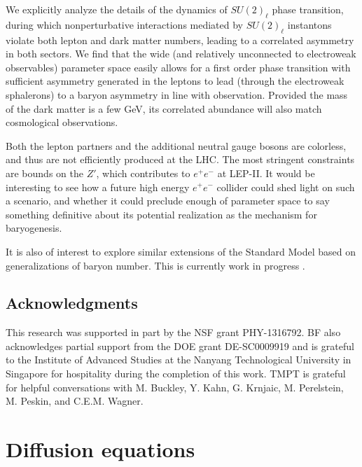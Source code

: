 \documentclass[prd,showpcs,amsmath,amssymb,nofootinbib,preprintnumbers,balancelastpage,longbibliography,superscriptaddress,notitlepage]{revtex4}
\begin{document}
We explicitly analyze the details of the dynamics of $SU(2)_\ell$ phase transition, during which nonperturbative interactions mediated by $SU(2)_\ell$ instantons
violate both lepton and dark matter numbers, leading to a correlated asymmetry in both sectors.  We find that the wide (and relatively unconnected to
electroweak observables) parameter space easily allows for a first order phase transition with sufficient asymmetry generated in the leptons to
lead (through the electroweak sphalerons) to a baryon asymmetry in line with observation.  Provided the mass of the dark matter is a few GeV, its correlated
abundance will also match cosmological observations.

Both the lepton partners and the additional neutral gauge bosons
are colorless, and thus are not efficiently produced at the LHC.
The most stringent constraints are bounds on the $Z'$, which contributes to $e^+ e^-$ at LEP-II.
It would be interesting to see how a future high energy $e^+ e^-$ collider could shed light on such a scenario, and whether it could preclude enough of
parameter space to say something definitive about its potential realization as the mechanism for baryogenesis. 

It is also of interest to explore similar extensions
of the Standard Model based on generalizations of baryon number.  This is currently work in progress \cite{West:2017boa}.



\subsection*{Acknowledgments}

This research was supported in part by the NSF grant PHY-1316792. BF also acknowledges partial support from the DOE grant DE-SC0009919 
and is grateful to the Institute of Advanced Studies at the Nanyang Technological University in Singapore for hospitality during the completion of this work.
TMPT is grateful for helpful conversations with M. Buckley, Y. Kahn, G. Krnjaic, M. Perelstein, M. Peskin, and C.E.M. Wagner.

\appendix


\section{Diffusion equations}

\label{app:app_diff}
\end{document}
